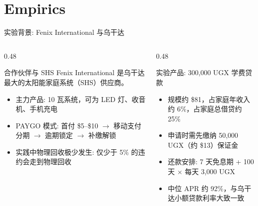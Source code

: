 \section{Empirics}

\begin{frame}{实验背景: Fenix International 与乌干达}
  \begin{columns}[T]
    \begin{column}{0.48\textwidth}
      \begin{block}{合作伙伴与 SHS}
        \small
        Fenix International 是乌干达最大的太阳能家庭系统（SHS）供应商。
        \begin{itemize}
          \item 主力产品: 10 瓦系统，可为 LED 灯、收音机、手机充电
          \item PAYGO 模式: 首付 \$5--\$10 $\rightarrow$ 移动支付分期 $\rightarrow$ 逾期锁定 $\rightarrow$ 补缴解锁
          \item 实践中物理回收极少发生: 仅少于 5\% 的违约会走到物理回收
        \end{itemize}
      \end{block}
    \end{column}
    \begin{column}{0.48\textwidth}
      \begin{block}{实验产品: 300{,}000 UGX 学费贷款}
        \small
        \begin{itemize}
          \item 规模约 \$81，占家庭年收入约 6\%，占家庭总借贷约 25\%
          \item 申请时需先缴纳 50{,}000 UGX（约 \$13）保证金
          \item 还款安排: 7 天免息期 + 100 天 $\times$ 每天 3{,}000 UGX
          \item 中位 APR 约 92\%，与乌干达小额贷款利率大致一致
        \end{itemize}
      \end{block}
    \end{column}
  \end{columns}
\end{frame}

